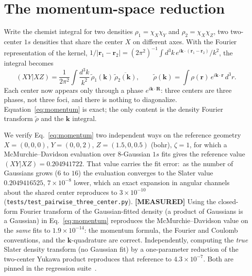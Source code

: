 \documentclass[aps,pra,twocolumn,superscriptaddress,longbibliography]{revtex4-2}
\newcommand{\gvq}[2]{#2}
\begin{document}
\section{The momentum-space reduction}
\label{sec:momentum}

Write the chemist integral for two densities
$\rho_{1}=\chi_{X}\chi_{Y}$ and $\rho_{2}=\chi_{X}\chi_{Z}$, two two-center
$1s$ densities that share the center $X$ on different axes.  With the Fourier
representation of the kernel,
$1/|\bm r_{1}-\bm r_{2}| = (2\pi^{2})^{-1}\!\int d^{3}k\,
e^{i\bm k\cdot(\bm r_{1}-\bm r_{2})}/k^{2}$, the integral becomes
%
\begin{equation}
  (XY|XZ) = \frac{1}{2\pi^{2}}\int \frac{d^{3}k}{k^{2}}\,
  \tilde\rho_{1}(\bm k)\,\overline{\tilde\rho_{2}(\bm k)},
  \qquad
  \tilde\rho(\bm k)=\!\int\! \rho(\bm r)\,e^{i\bm k\cdot\bm r}\,d^{3}r .
  \label{eq:momentum}
\end{equation}
%
Each center now appears only through a phase $e^{i\bm k\cdot\bm R}$: three
centers are three phases, not three foci, and there is nothing to
diagonalize.  Equation~\eqref{eq:momentum} is exact; the only content is the
density Fourier transform $\tilde\rho$ and the $\bm k$ integral.

We verify Eq.~\eqref{eq:momentum} two independent ways on the reference
geometry $X=(0,0,0)$, $Y=(0,0,2)$, $Z=(1.5,0,0.5)$ (bohr), $\zeta=1$, for
which a McMurchie--Davidson evaluation over $8$-Gaussian $1s$ fits gives the
reference value $(XY|XZ)=\gvq{three_center_eri_truth}{0.204941722}$.  That
value carries the fit error:\ as the number of Gaussians grows ($6$ to $16$)
the evaluation converges to the Slater value
$\gvq{three_center_eri_slater}{0.2049416525}$, $7\times10^{-8}$ lower, which an
exact expansion in angular channels about the shared center reproduces to
$3\times10^{-10}$ (\texttt{tests/test\_pairwise\_three\_center.py}).  \textbf{[MEASURED]} Using the closed-form
Fourier transform of the Gaussian-fitted density (a product of Gaussians is a
Gaussian) in Eq.~\eqref{eq:momentum} reproduces the McMurchie--Davidson value
on the \emph{same} fits to $1.9\times10^{-14}$: the momentum formula, the
Fourier and Coulomb conventions, and the $\bm k$-quadrature are correct.
Independently, computing the \emph{true} Slater density transform (no Gaussian
fit) by a one-parameter reduction of the two-center Yukawa product reproduces
that reference to $4.3\times10^{-7}$.  Both are pinned in the regression
suite~\cite{test_routeC}.
\end{document}
